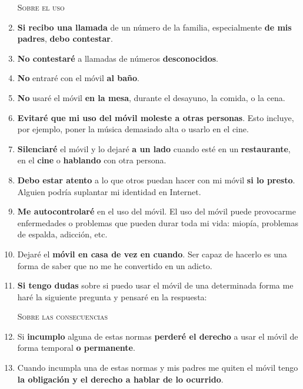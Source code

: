 \documentclass[12pt]{article}
\begin{document}
\begin{enumerate}
\begin{center}
  \textsc{Sobre el uso}
\end{center}

\item \textbf{Si recibo una llamada} de un número de la familia, especialmente
  \textbf{de mis padres}, \textbf{debo contestar}.

\item \textbf{No contestaré} a llamadas de números \textbf{desconocidos}.

\item \textbf{No} entraré con el móvil \textbf{al baño}.

\item \textbf{No} usaré el móvil \textbf{en la mesa}, durante el desayuno, la comida, o la cena.

\item \textbf{Evitaré que mi uso del móvil moleste a otras
    personas}. Esto incluye, por ejemplo, poner la música demasiado
  alta o usarlo en el cine.

\item \textbf{Silenciaré} el móvil y lo dejaré \textbf{a un lado}
  cuando esté en un \textbf{restaurante}, en el \textbf{cine} o \textbf{hablando} con otra
  persona.

\item \textbf{Debo estar atento} a lo que otros puedan hacer con mi
  móvil \textbf{si lo presto}. Alguien podría suplantar mi identidad
  en Internet.

\item \textbf{Me autocontrolaré} en el uso del móvil. El uso del móvil puede
  provocarme enfermedades o problemas que pueden durar toda mi vida:
  miopía, problemas de espalda, adicción, etc.

\item Dejaré el \textbf{móvil en casa de vez en cuando}. Ser capaz de
  hacerlo es una forma de saber que no me he convertido en
  un adicto.

\item \textbf{Si tengo dudas} sobre si puedo usar el móvil de una determinada
  forma me haré la siguiente pregunta y pensaré en la respuesta:
  \textbf{}

\begin{center}
  \textsc{Sobre las consecuencias}
\end{center}

\item Si \textbf{incumplo} alguna de estas normas \textbf{perderé el
    derecho} a usar el móvil de forma temporal \textbf{o permanente}.

\item Cuando incumpla una de estas normas y mis padres me quiten el
  móvil tengo \textbf{la obligación y el derecho a hablar de lo ocurrido}.

\end{enumerate}
\end{document}
